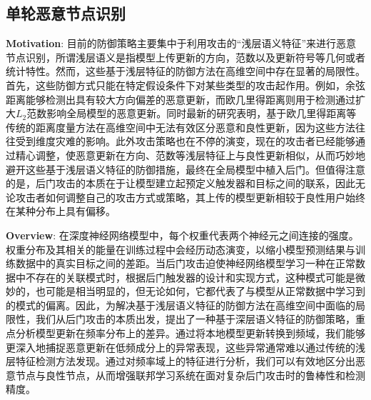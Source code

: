 \documentclass[lettersize,journal]{IEEEtran}
\begin{document}
\subsection{单轮恶意节点识别}
\textbf{Motivation}: 目前的防御策略主要集中于利用攻击的“浅层语义特征”来进行恶意节点识别，所谓浅层语义是指模型上传更新的方向，范数以及更新符号等几何或者统计特性。然而，这些基于浅层特征的防御方法在高维空间中存在显著的局限性。
首先，这些防御方式只能在特定假设条件下对某些类型的攻击起作用。例如，余弦距离能够检测出具有较大方向偏差的恶意更新，而欧几里得距离则用于检测通过扩大$L_2$范数影响全局模型的恶意更新。同时最新的研究表明\cite{huang2023multi}，基于欧几里得距离等传统的距离度量方法在高维空间中无法有效区分恶意和良性更新，因为这些方法往往受到维度灾难的影响。此外攻击策略也在不停的演变，现在的攻击者已经能够通过精心调整，使恶意更新在方向、范数等浅层特征上与良性更新相似，从而巧妙地避开这些基于浅层语义特征的防御措施，最终在全局模型中植入后门。但值得注意的是，后门攻击的本质在于让模型建立起预定义触发器和目标之间的联系，因此无论攻击者如何调整自己的攻击方式或策略，其上传的模型更新相较于良性用户始终在某种分布上具有偏移。

\textbf{Overview}: 在深度神经网络模型中，每个权重代表两个神经元之间连接的强度。权重分布及其相关的能量在训练过程中会经历动态演变，以缩小模型预测结果与训练数据中的真实目标之间的差距。当后门攻击迫使神经网络模型学习一种在正常数据中不存在的关联模式时，根据后门触发器的设计和实现方式，这种模式可能是微妙的，也可能是相当明显的，但无论如何，它都代表了与模型从正常数据中学习到的模式的偏离。因此，为解决基于浅层语义特征的防御方法在高维空间中面临的局限性，我们从后门攻击的本质出发，提出了一种基于深层语义特征的防御策略，重点分析模型更新在频率分布上的差异。通过将本地模型更新转换到频域，我们能够更深入地捕捉恶意更新在低频成分上的异常表现，这些异常通常难以通过传统的浅层特征检测方法发现。通过对频率域上的特征进行分析，我们可以有效地区分出恶意节点与良性节点，从而增强联邦学习系统在面对复杂后门攻击时的鲁棒性和检测精度。
\end{document}
